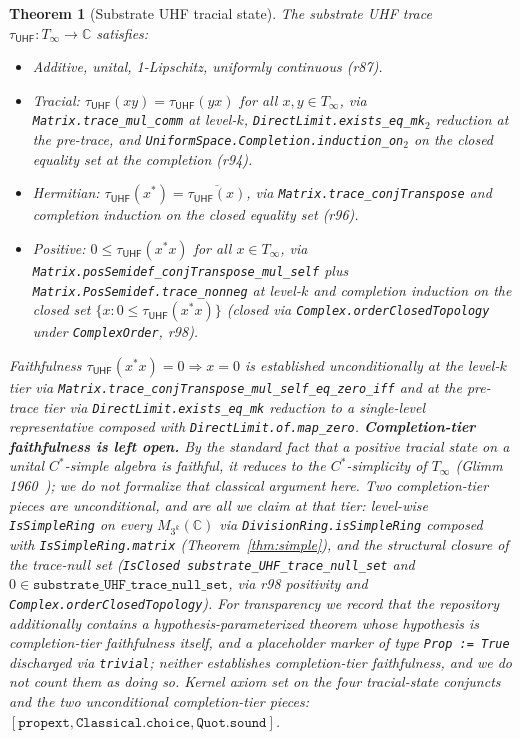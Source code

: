 \documentclass[11pt,a4paper]{amsart}
\theoremstyle{plain}
\newtheorem{theorem}{Theorem}[section]
\theoremstyle{definition}
\begin{document}
\begin{theorem}[Substrate UHF tracial state]\label{thm:uhf-trace}
The substrate UHF trace $\tau_{\textsf{UHF}} \colon T_\infty \to \mathbb{C}$ satisfies:
\begin{itemize}[itemsep=1pt]
\item \emph{Additive, unital, 1-Lipschitz, uniformly continuous} (r87).
\item \emph{Tracial}: $\tau_{\textsf{UHF}}(xy) = \tau_{\textsf{UHF}}(yx)$ for all $x, y \in T_\infty$, via \texttt{Matrix.trace\_mul\_comm} at level-$k$, \texttt{DirectLimit.exists\_eq\_mk}$_2$ reduction at the pre-trace, and \texttt{UniformSpace.Completion.induction\_on}$_2$ on the closed equality set at the completion (r94).
\item \emph{Hermitian}: $\tau_{\textsf{UHF}}(x^*) = \overline{\tau_{\textsf{UHF}}(x)}$, via \texttt{Matrix.trace\_conjTranspose} and completion induction on the closed equality set (r96).
\item \emph{Positive}: $0 \le \tau_{\textsf{UHF}}(x^* x)$ for all $x \in T_\infty$, via \texttt{Matrix.posSemidef\_conjTranspose\_mul\_self} plus \texttt{Matrix.PosSemidef.trace\_nonneg} at level-$k$ and completion induction on the closed set $\{x : 0 \le \tau_{\textsf{UHF}}(x^* x)\}$ (closed via \texttt{Complex.orderClosedTopology} under \texttt{ComplexOrder}, r98).
\end{itemize}
Faithfulness $\tau_{\textsf{UHF}}(x^* x) = 0 \Rightarrow x = 0$ is established \emph{unconditionally} at the level-$k$ tier via \texttt{Matrix.trace\_conjTranspose\_mul\_self\_eq\_zero\_iff} and at the pre-trace tier via \texttt{DirectLimit.exists\_eq\_mk} reduction to a single-level representative composed with \texttt{DirectLimit.of.map\_zero}. \textbf{Completion-tier faithfulness is left open.} By the standard fact that a positive tracial state on a unital $C^*$-simple algebra is faithful, it reduces to the $C^*$-simplicity of $T_\infty$ (Glimm 1960~\cite{glimm1960}); we do not formalize that classical argument here. Two completion-tier pieces \emph{are} unconditional, and are all we claim at that tier: level-wise \texttt{IsSimpleRing} on every $M_{3^k}(\mathbb{C})$ via \texttt{DivisionRing.isSimpleRing} composed with \texttt{IsSimpleRing.matrix} (Theorem~\ref{thm:simple}), and the structural closure of the trace-null set (\texttt{IsClosed}~\texttt{substrate\_UHF\_trace\_null\_set} and $0 \in \texttt{substrate\_UHF\_trace\_null\_set}$, via r98 positivity and \texttt{Complex.orderClosedTopology}). For transparency we record that the repository additionally contains a hypothesis-parameterized theorem whose hypothesis is completion-tier faithfulness itself, and a placeholder marker  of type \texttt{Prop := True} discharged via \texttt{trivial}; neither establishes completion-tier faithfulness, and we do not count them as doing so. Kernel axiom set on the four tracial-state conjuncts and the two unconditional completion-tier pieces: $[\texttt{propext}, \texttt{Classical.choice}, \texttt{Quot.sound}]$.
\end{theorem}
\end{document}
